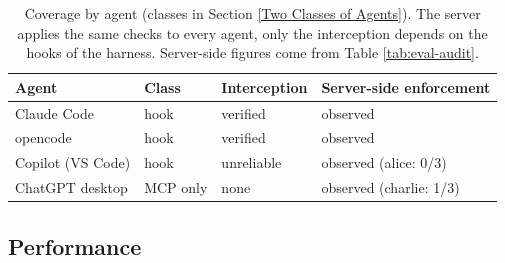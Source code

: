\begin{table}[H]
  \centering
  \begingroup\linespread{1.0}\small
  \begin{tabular}{@{}llll@{}}
    \toprule
    \textbf{Agent} & \textbf{Class} & \textbf{Interception} & \textbf{Server-side enforcement} \\
    \midrule
    Claude Code       & hook     & verified   & observed \\
    opencode          & hook     & verified   & observed \\
    Copilot (VS Code) & hook     & unreliable & observed (alice: 0/3) \\
    ChatGPT desktop   & MCP only & none       & observed (charlie: 1/3) \\
    \bottomrule
  \end{tabular}
  \endgroup
  \caption{Coverage by agent (classes in Section \ref{Two Classes of Agents}). The server applies the same checks to every agent, only the interception depends on the hooks of the harness. Server-side figures come from Table \ref{tab:eval-audit}.}\label{tab:eval-coverage}
\end{table}

\subsection{Performance}\label{sec:eval-perf}

